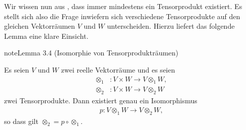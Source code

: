 \documentclass[letterpaper,10pt,english]{jupyterBook}
\begin{document}
\sphinxAtStartPar
Wir wissen nun aus {\hyperref[\detokenize{vektoranalysis/tensor:thm:existenzTensorprodukt}]{}}, dass immer mindestens ein Tensorprodukt existiert.
Es stellt sich also die Frage inwiefern sich verschiedene Tensorprodukte auf den gleichen Vektorräumen \(V\) und \(W\) unterscheiden.
Hierzu liefert das folgende Lemma eine klare Einsicht.
\label{vektoranalysis/tensor:lem:isomorphismusTensorproduktraum}
\begin{sphinxadmonition}{note}{Lemma 3.4 (Isomorphie von Tensorprodukträumen)}



\sphinxAtStartPar
Es seien \(V\) und \(W\) zwei reelle Vektorräume und es seien
\begin{equation*}
\begin{split}\otimes_1 &\colon V \times W \rightarrow V \otimes_1 W,\\
\otimes_2 &\colon V \times W \rightarrow V \otimes_2 W\end{split}
\end{equation*}
\sphinxAtStartPar
zwei Tensorprodukte.
Dann existiert genau ein Isomorphismus
\begin{equation*}
\begin{split}p: V\otimes_1 W \to V\otimes_2 W,\end{split}
\end{equation*}
\sphinxAtStartPar
so dass gilt \(\otimes_2 = p\circ \otimes_1\).
\end{sphinxadmonition}
\end{document}
